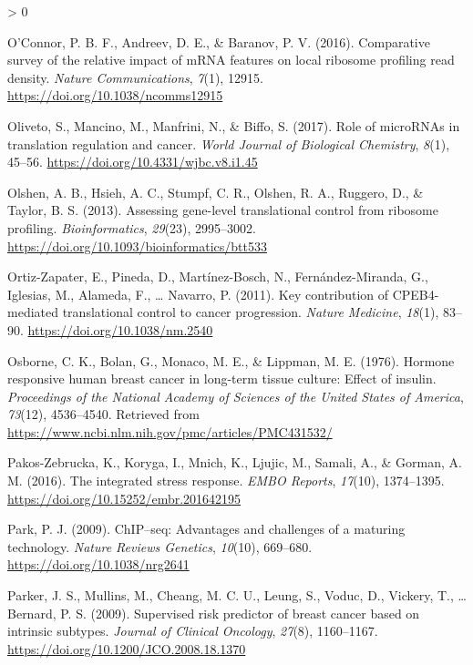 \documentclass[
  12pt,
  openany]{book}
\newlength{\cslhangindent}
\newenvironment{CSLReferences}[2] %
 {%
  \setlength{\parindent}{0pt}
  \ifodd #1 \everypar{\setlength{\hangindent}{\cslhangindent}}\ignorespaces\fi
  \ifnum #2 > 0
  \setlength{\parskip}{#2\baselineskip}
  \fi
 }%
 {}
\begin{document}
\begin{CSLReferences}{1}{0}
\leavevmode\hypertarget{ref-OConnor2016}{}%
O'Connor, P. B. F., Andreev, D. E., \& Baranov, P. V. (2016). Comparative survey of the relative impact of {mRNA} features on local ribosome profiling read density. \emph{Nature Communications}, \emph{7}(1), 12915. \url{https://doi.org/10.1038/ncomms12915}

\leavevmode\hypertarget{ref-Oliveto2017}{}%
Oliveto, S., Mancino, M., Manfrini, N., \& Biffo, S. (2017). Role of {microRNAs} in translation regulation and cancer. \emph{World Journal of Biological Chemistry}, \emph{8}(1), 45--56. \url{https://doi.org/10.4331/wjbc.v8.i1.45}

\leavevmode\hypertarget{ref-Olshen2013}{}%
Olshen, A. B., Hsieh, A. C., Stumpf, C. R., Olshen, R. A., Ruggero, D., \& Taylor, B. S. (2013). Assessing gene-level translational control from ribosome profiling. \emph{Bioinformatics}, \emph{29}(23), 2995--3002. \url{https://doi.org/10.1093/bioinformatics/btt533}

\leavevmode\hypertarget{ref-Ortiz-Zapater2011}{}%
Ortiz-Zapater, E., Pineda, D., Martínez-Bosch, N., Fernández-Miranda, G., Iglesias, M., Alameda, F., \ldots{} Navarro, P. (2011). Key contribution of {CPEB}4-mediated translational control to cancer progression. \emph{Nature Medicine}, \emph{18}(1), 83--90. \url{https://doi.org/10.1038/nm.2540}

\leavevmode\hypertarget{ref-Osborne1976}{}%
Osborne, C. K., Bolan, G., Monaco, M. E., \& Lippman, M. E. (1976). Hormone responsive human breast cancer in long-term tissue culture: Effect of insulin. \emph{Proceedings of the National Academy of Sciences of the United States of America}, \emph{73}(12), 4536--4540. Retrieved from \url{https://www.ncbi.nlm.nih.gov/pmc/articles/PMC431532/}

\leavevmode\hypertarget{ref-Pakos-Zebrucka2016}{}%
Pakos-Zebrucka, K., Koryga, I., Mnich, K., Ljujic, M., Samali, A., \& Gorman, A. M. (2016). The integrated stress response. \emph{{EMBO} Reports}, \emph{17}(10), 1374--1395. \url{https://doi.org/10.15252/embr.201642195}

\leavevmode\hypertarget{ref-Park2009}{}%
Park, P. J. (2009). {ChIP}--seq: Advantages and challenges of a maturing technology. \emph{Nature Reviews Genetics}, \emph{10}(10), 669--680. \url{https://doi.org/10.1038/nrg2641}

\leavevmode\hypertarget{ref-Parker2009}{}%
Parker, J. S., Mullins, M., Cheang, M. C. U., Leung, S., Voduc, D., Vickery, T., \ldots{} Bernard, P. S. (2009). Supervised risk predictor of breast cancer based on intrinsic subtypes. \emph{Journal of Clinical Oncology}, \emph{27}(8), 1160--1167. \url{https://doi.org/10.1200/JCO.2008.18.1370}


\end{CSLReferences}
\end{document}
